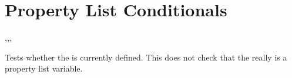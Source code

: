 \documentclass[oneside]{book}
\begin{document}


\section{Property List Conditionals}

\begin{function}{\propIfExist,\propIfExistT,\propIfExistF,\propIfExistTF}
\begin{syntax}
 
  
  
   
\end{syntax}
Tests whether the  is currently defined.  This does not
check that the  really is a property list variable.
\begin{demohigh}
\propIfExistTF {} {}
\propIfExistTF {} {}
\end{demohigh}
\end{function}
\end{document}
